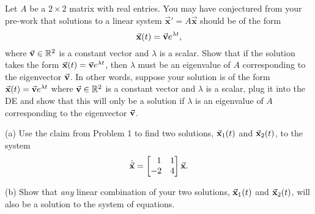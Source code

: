 \documentclass[epsf]{article}
\begin{document}
 Let $A$ be a $2 \times 2$ matrix with real entries.  You may have conjectured from your pre-work that solutions to a linear system $\vec{\mathbf{ x}}' = A\vec{\mathbf{ x}}$ should be of the form $$ \vec{\bf x}(t) = \vec{\bf v}e^{\lambda t},$$ where $\vec{\bf v}\in \mathbb{R}^2$ is a constant vector and $\lambda$ is a scalar.  
\vskip 2mm
Show that if the solution takes the form $ \vec{\bf x}(t) = \vec{\bf v}e^{\lambda t}$, then $\lambda$ must be an eigenvalue of $A$ corresponding to the eigenvector $\vec{\bf v}$.  In other words, suppose your solution is of the form $ \vec{\bf x}(t) = \vec{\bf v}e^{\lambda t}$ where $\vec{\bf v}\in \mathbb{R}^2$ is a constant vector and $\lambda$ is a scalar, plug it into the DE and show that this will only be a solution if $\lambda$ is an eigenvalue of $A$ corresponding to the eigenvector $\vec{\bf v}$.
\vskip 4mm

 (a) Use the claim from Problem 1 to find two solutions, $\vec{\bf x}_1(t)$ and $\vec{\bf x}_2(t)$, to the system
$$\dot{\vec{\mathbf{ x}}} = \begin{bmatrix}\ \ 1 & 1 \cr -2 & 4  \end{bmatrix}\vec{\mathbf{x}}.$$ 


\noi (b) Show that \textit{any} linear combination of your two solutions, $\vec{\bf x}_1(t)$ and $\vec{\bf x}_2(t)$, will also be a solution to the system of equations.
\end{document}
